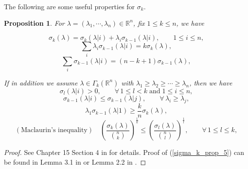 \documentclass[12pt]{amsart}
\newtheorem{proposition}[theorem]{Proposition}
\theoremstyle{definition}
\theoremstyle{remark}
\numberwithin{equation}{section}
\begin{document}
The following are some useful properties for $\sigma_{k}$.
\begin{proposition}
	For $\lambda = (\lambda_1, \cdots, \lambda_n) \in \mathbb{R}^n$, fix $1 \leq k \leq n$, we have
	
	\begin{equation}\label{sigma_k_prop_1}
	\sigma_k (\lambda) = \sigma_k(\lambda|i) + \lambda_i \sigma_{k-1} (\lambda|i), \qquad 1 \leq i \leq n,
	\end{equation}
	\begin{equation}\label{sigma_k_prop_2}
	\sum_i \lambda_i \sigma_{k-1}(\lambda|i) = k \sigma_k(\lambda),
	\end{equation}
	\begin{equation}\label{sigma_k_prop_3}
	\sum_i \sigma_{k-1}(\lambda|i) = (n - k + 1) \sigma_{k-1}(\lambda),
	\end{equation}
	
	If in addition we assume $\lambda \in \Gamma_{k}(\mathbb{R}^n)$ with $\lambda_1 \geq \lambda_2 \geq \cdots \geq \lambda_n$, then we have
	\begin{equation}\label{sigma_k_prop_4}
	\sigma_l (\lambda|i) > 0, \qquad \forall\, 1 \leq l < k \; \text{and}\; 1 \leq i \leq n,
	\end{equation}
	\begin{equation}\label{sigma_k_prop_7}
	\sigma_{k-1}(\lambda|i) \leq \sigma_{k-1}(\lambda|j), \qquad \forall\, \lambda_i \geq  \lambda_j,
	\end{equation}
	\begin{equation}\label{sigma_k_prop_5}
	\lambda_1 \sigma_{k-1}(\lambda|1) \geq \frac{k}{n} \sigma_k (\lambda), 
	\end{equation}
	\begin{equation}\label{sigma_k_prop_8}
	(\text{Maclaurin's inequality}) \quad
	\left(\frac{\sigma_k (\lambda)}{{{n}\choose{k}}}\right)^{\frac{1}{k}} \leq \left(\frac{\sigma_l (\lambda)}{{{n}\choose{l}}}\right)^{\frac{1}{l}}, \qquad \forall\, 1 \leq l \leq k,
	\end{equation}
\end{proposition}
\begin{proof}
	See Chapter 15 Section 4 in \cite{Lieberman96} for details. Proof of (\ref{sigma_k_prop_5}) can be found in Lemma 3.1 in \cite{ChouWang01} or Lemma 2.2 in \cite{HouMaWu10}.
\end{proof}
\end{document}
